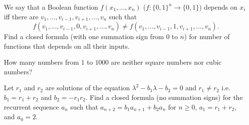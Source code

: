 \documentclass[addpoints,answers]{exam}
\begin{document}
    \pagestyle{headandfoot}
    \runningheadrule

    \firstpagefooter{}{}{}
    \runningfooter{}{}{}
    \begin{flushright}

        \vspace{0.2in}

    \end{flushright}

    \begin{questions}
        \question[10]
            We say that a Boolean function $f(x_1, \dots, x_n)$ 
            ($f : \{0, 1\}^n \to \{0, 1\}$) depends on $x_i$ iff there are $v_1, \dots, v_{i
            - 1}, v_{i + 1}, \dots, v_n$ such that 
            \[
                f(v_1, \dots, v_{i - 1}, 0, v_{i + 1}, \dots, v_n) \neq 
                f(v_1, \dots, v_{i - 1}, 1, v_{i + 1}, \dots, v_n).
            \]
            Find a closed formula (with one summation sign from $0$ to $n$) for number of
            functions that depends on all their inputs.
            \begin{solutionorbox}[\stretch{1}]
            \end{solutionorbox}
            \newpage
 
        \question[10]
            How many numbers from $1$ to $1000$ are neither square numbers nor cubic
            numbers?
            \begin{solutionorbox}[\stretch{1}]
            \end{solutionorbox}
            \newpage
 
        \question[10]
            Let $r_1$ and $r_2$ are solutions of the equation $\lambda^2 - b_1 \lambda -
            b_2 = 0$ and $r_1 \neq r_2$ i.e. $b_1 = r_1 + r_2$ and $b_2 = - r_1 r_2$.
            Find a closed formula (no summation signs) for the recurrent sequence $a_n$ such
            that $a_{n + 2} = b_1 a_{n + 1} + b_2 a_{n}$ for $n \ge 0$, $a_1 = r_1 + r_2$,
            and $a_0 = 2$.
            \begin{solutionorbox}[\stretch{1}]
            \end{solutionorbox}
            \newpage
 
\end{questions}
\end{document}
